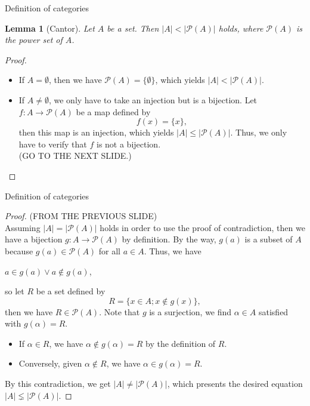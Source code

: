 \documentclass[dvipdfmx,10pt,notheorems]{beamer}
\newtheorem{lemma}[theorem]{Lemma}
\renewcommand{\#}{^\sharp}
\begin{document}
	\begin{frame}{Definition of categories}
			\begin{lemma}[Cantor]
					Let $A$ be a set. Then $|A|<|\mathcal{P}(A)|$ holds, where $\mathcal{P}(A)$ is the power set of $A$.
			\end{lemma}
			\begin{proof}
					\begin{itemize}
							\item If $A=\emptyset$, then we have $\mathcal{P}(A)=\{\emptyset\}$,
							which yields $|A|<|\mathcal{P}(A)|$.
							\item If $A\neq \emptyset$, we only have to take an injection but  is a bijection.
							Let $f:A\rightarrow \mathcal{P}(A)$ be a map defined by
									$$
											f(x)=\{x\},
									$$
							then this map is an injection, which yields $|A|\leq|\mathcal{P}(A)|$.
							Thus, we only have to verify that $f$ is not a bijection.\\
							(GO TO THE NEXT SLIDE.)
					\end{itemize}
			\end{proof}			
	\end{frame}
	
	
	
	\begin{frame}{Definition of categories}
			\begin{proof}
					(FROM THE PREVIOUS SLIDE)\\
					Assuming $|A|=|\mathcal{P}(A)|$ holds
					in order to use the proof of contradiction,
					then we have a bijection $g:A\rightarrow\mathcal{P}(A)$
					by definition.
					By the way, $g(a)$ is a subset of $A$ because $g(a)\in\mathcal{P}(A)$ for all $a\in A$.
					Thus, we have\\
							\begin{center}
									$a\in g(a) \vee a\notin g(a)$,
							\end{center}
					so let $R$ be a set defined by
							$$
									R=\{x\in A; x\notin g(x)\},
							$$
					then we have $R\in\mathcal{P}(A)$.
					Note that $g$ is a surjection, we find $\alpha\in A$ satisfied with $g(\alpha)=R$.
					\begin{itemize}
							\item
							If $\alpha\in R$, we have $\alpha\notin g(\alpha)=R$ by the definition of $R$.
							\item
							Conversely, given $\alpha \notin R$, we have $\alpha\in g(\alpha)=R$.
					\end{itemize}
					By this contradiction, we get $|A|\neq |\mathcal{P}(A)|$,
					which presents the desired equation $|A|\lneq|\mathcal{P}(A)|$.
			\end{proof}
	\end{frame}
	
\end{document}

